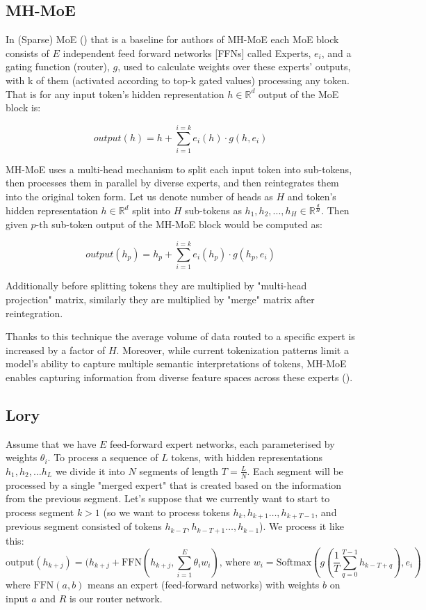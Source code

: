 \documentclass[12pt]{article}
\begin{document}
\subsection{MH-MoE} 
In (Sparse) MoE (\cite{shazeer2017outrageously}) that is a baseline for authors of MH-MoE each MoE block consists of $E$ independent feed forward networks [FFNs] called Experts, $e_i$, and a gating function (router), $g$, used to calculate weights over these experts' outputs, with k of them (activated according to top-k gated values) processing any token. That is for any input token's hidden representation $h \in \mathbb{R}^d$ output of the MoE block is:

\[ output(h)=h+\sum_{i=1}^{i=k} e_i (h)  \cdot g(h, e_i)\]

MH-MoE uses a multi-head mechanism to split each input token into sub-tokens, then processes them in parallel by diverse experts, and then reintegrates them into the original token form. Let us denote number of heads as $H$ and token's hidden representation $h \in \mathbb{R}^d $ split into $H$ sub-tokens as $h_1,h_2,...,h_H \in \mathbb{R}^{\frac{d}{H}} $. Then given $p$-th sub-token output of the MH-MoE block would be computed as:

\[ output(h_p)= h_p + \sum_{i=1}^{i=k} e_i (h_p)  \cdot g(h_p,e_i)\]

Additionally before splitting tokens they are multiplied by "multi-head projection" matrix, similarly they are multiplied by "merge" matrix after reintegration.

Thanks to this technique the average volume of data routed to a specific expert is increased by a factor of $H$.
Moreover, while current tokenization patterns limit a model's ability to capture multiple semantic interpretations of tokens, MH-MoE enables capturing information from diverse feature spaces across these experts (\cite{wu2024multihead}).


\subsection{Lory}
Assume that we have $E$ feed-forward expert networks, each parameterised by weights $\theta_i$. To process a sequence of $L$ tokens, with hidden representations $h_1, h_2, \dots h_L$ we divide it into $N$ segments of length $T = \frac{L}{N}$. Each segment will be processed by a single "merged expert" that is created based on the information from the previous segment. Let's suppose that we currently want to start to process segment $k>1$ (so we want to process tokens $h_k, h_{k+1}\dots ,h_{k+T -1}$, and previous segment consisted of tokens $h_{k - T}, h_{k-T+1}\dots ,h_{k-1}$). We process it like this:
\[\text{output}(h_{k + j}) = (h_{k + j} + \text{FFN}(h_{k+j}, \sum_{i=1}^E \theta_i w_i) \text{,   where  } w_i = \text{Softmax}(g(\frac{1}{T}\sum_{q = 0}^{T-1}h_{k-T+q}), e_i)\] where $\text{FFN}(a, b)$ means an expert (feed-forward networks) with weights $b$ on input $a$ and $R$ is our router network.
\end{document}
